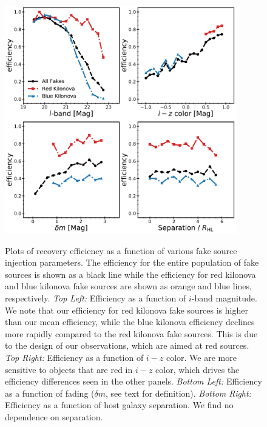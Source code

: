 \begin{figure}[!t]
\begin{center}
\hspace*{-0.1in} 
\scalebox{1.}
{\includegraphics[width=0.9\textwidth]{./figs/chapter3/f6.pdf}}  
\caption{Plots of recovery efficiency as a function of various fake source injection parameters. The efficiency for the entire population of fake sources is shown as a black line while the efficiency for red kilonova and blue kilonova fake sources are shown as orange and blue lines, respectively. {\it Top Left:} Efficiency as a function of $i$-band magnitude. We note that our efficiency for red kilonova fake sources is higher than our mean efficiency, while the blue kilonova efficiency declines more rapidly compared to the red kilonova fake sources. This is due to the design of our observations, which are aimed at red sources. {\it Top Right:} Efficiency as a function of $i-z$ color. We are more sensitive to objects that are red in $i-z$ color, which drives the efficiency differences seen in the other panels. {\it Bottom Left:} Efficiency as a function of fading ($\delta m$, see text for definition). {\it Bottom Right:} Efficiency as a function of host galaxy separation. We find no dependence on separation.}
\label{fig:eff_1D}
\end{center}
\end{figure}

